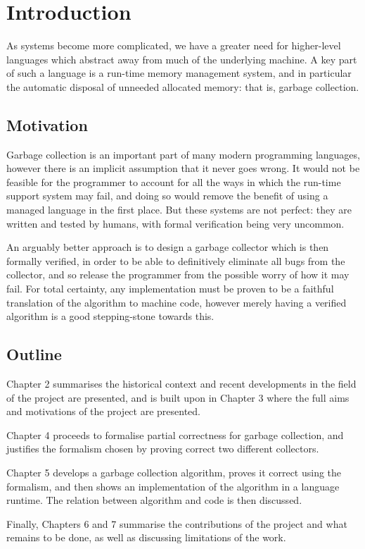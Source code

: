 \chapter{Introduction}

As systems become more complicated, we have a greater need for
higher-level languages which abstract away from much of the underlying
machine. A key part of such a language is a run-time memory management
system, and in particular the automatic disposal of unneeded allocated
memory: that is, garbage collection.

\section{Motivation}

Garbage collection is an important part of many modern programming
languages, however there is an implicit assumption that it never goes
wrong. It would not be feasible for the programmer to account for all
the ways in which the run-time support system may fail, and doing so
would remove the benefit of using a managed language in the first
place. But these systems are not perfect: they are written and tested
by humans, with formal verification being very uncommon.

An arguably better approach is to design a garbage collector which is
then formally verified, in order to be able to definitively eliminate
all bugs from the collector, and so release the programmer from the
possible worry of how it may fail. For total certainty, any
implementation must be proven to be a faithful translation of the
algorithm to machine code, however merely having a verified algorithm
is a good stepping-stone towards this.

\section{Outline}

Chapter 2 summarises the historical context and recent developments in
the field of the project are presented, and is built upon in Chapter 3
where the full aims and motivations of the project are presented.

Chapter 4 proceeds to formalise partial correctness for
garbage collection, and justifies the formalism chosen by proving
correct two different collectors.

Chapter 5 develops a garbage collection algorithm, proves it
correct using the formalism, and then shows an implementation of the
algorithm in a language runtime. The relation between algorithm and
code is then discussed.

Finally, Chapters 6 and 7 summarise the contributions of the project
and what remains to be done, as well as discussing limitations of the
work.
